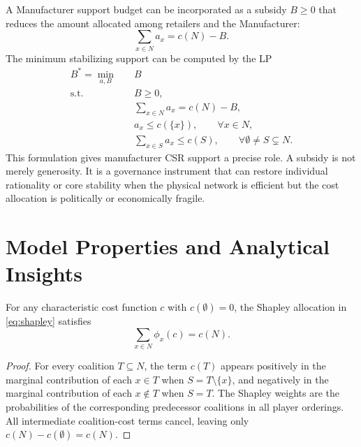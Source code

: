 A Manufacturer support budget can be incorporated as a subsidy $B\geq 0$ that reduces the amount allocated among retailers and the Manufacturer:
\begin{equation}
\label{eq:ch4_subsidized_allocation}
\sum_{x\in N}a_x=c(N)-B.
\end{equation}
The minimum stabilizing support can be computed by the LP
\begin{equation}
\label{eq:ch4_min_subsidy}
\begin{aligned}
B^*=\min_{a,B}\quad & B\\
\text{s.t.}\quad
& B\geq 0,\\
& \sum_{x\in N}a_x=c(N)-B,\\
& a_x\leq c(\{x\}), \qquad \forall x\in N,\\
& \sum_{x\in S}a_x\leq c(S), \qquad \forall \emptyset\neq S\subsetneq N.
\end{aligned}
\end{equation}
This formulation gives manufacturer CSR support a precise role. A subsidy is not merely generosity. It is a governance instrument that can restore individual rationality or core stability when the physical network is efficient but the cost allocation is politically or economically fragile.

\section{Model Properties and Analytical Insights}
\label{sec:properties}

\begin{proposition}
\label{prop:ch4_efficiency}
For any characteristic cost function $c$ with $c(\emptyset)=0$, the Shapley allocation in \eqref{eq:shapley} satisfies
\begin{equation}
\label{eq:ch4_shapley_efficiency}
\sum_{x\in N}\phi_x(c)=c(N).
\end{equation}
\end{proposition}

\begin{proof}
For every coalition $T\subseteq N$, the term $c(T)$ appears positively in the marginal contribution of each $x\in T$ when $S=T\setminus\{x\}$, and negatively in the marginal contribution of each $x\notin T$ when $S=T$. The Shapley weights are the probabilities of the corresponding predecessor coalitions in all player orderings. All intermediate coalition-cost terms cancel, leaving only $c(N)-c(\emptyset)=c(N)$.
\end{proof}


